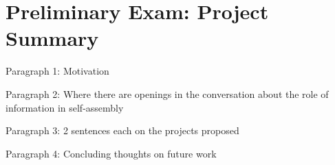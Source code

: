 \thispagestyle{empty}
\section*{Preliminary Exam: Project Summary}


Paragraph 1: Motivation

Paragraph 2: Where there are openings in the conversation about the role of information in self-assembly

Paragraph 3: 2 sentences each on the projects proposed

Paragraph 4: Concluding thoughts on future work